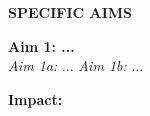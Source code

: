 \documentclass[combined.tex]{subfiles}
\begin{document}
\uppercase{\textbf{Specific Aims}} 


\textbf{Aim 1: ...} \\
\textit{Aim 1a:}  ...
\textit{Aim 1b:} ...


\textbf{Impact:}
\end{document}
